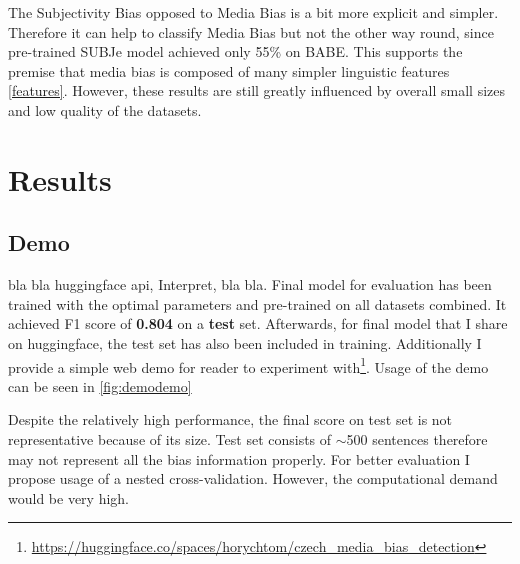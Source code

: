 The Subjectivity Bias opposed to Media Bias is a bit more explicit and simpler. Therefore it can help to classify Media Bias but not the other way round, since pre-trained SUBJe model achieved only 55\% on BABE. This supports the premise that media bias is composed of many simpler linguistic features \ref{features}. However, these results are still greatly influenced by overall small sizes and low quality of the datasets.




\section{Results}

\subsection{Demo}
bla bla huggingface api, Interpret, bla bla.
Final model for evaluation has been trained with the optimal parameters and pre-trained on all datasets combined. It achieved F1 score of \textbf{0.804} on a \textbf{test} set. Afterwards, for final model that I share on huggingface, the test set has also been included in training. Additionally I provide a simple web demo for reader to experiment with\footnote{\url{https://huggingface.co/spaces/horychtom/czech_media_bias_detection}}. Usage of the demo can be seen in \ref{fig:demodemo}

\begin{figure}
\end{figure}


Despite the relatively high performance, the final score on test set is not representative because of its size. Test set consists of $\sim$500 sentences therefore may not represent all the bias information properly. For better evaluation I propose usage of a nested cross-validation. However, the computational demand would be very high. 

